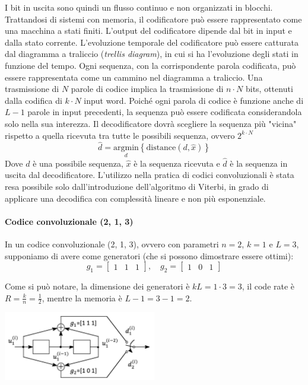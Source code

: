 I bit in uscita sono quindi un flusso continuo e non organizzati in blocchi.
Trattandosi di sistemi con memoria, il codificatore può essere rappresentato come una macchina a stati finiti.
L'output del codificatore dipende dal bit in input e dalla stato corrente.
L'evoluzione temporale del codificatore può essere catturata dal diagramma a traliccio (\textit{trellis diagram}), in cui si ha l'evoluzione degli stati in funzione del tempo.
Ogni sequenza, con la corrispondente parola codificata, può essere rappresentata come un cammino nel diagramma a traliccio.
Una trasmissione di $N$ parole di codice implica la trasmissione di $n \cdot N$ bits, ottenuti dalla codifica di $k \cdot N$ input word.
Poiché ogni parola  di codice è funzione anche di $L-1$ parole in input precedenti, la sequenza può essere codificata considerandola solo nella sua interezza. 
Il decodificatore dovrà scegliere la sequenza più "vicina" rispetto a quella ricevuta tra tutte le possibili sequenza, ovvero $2^{k \cdot N}$
\[
    \hat{d} = \underset{d}{\text{argmin}} \left\{\text{distance}(d, \hat{x})\right\}
\]
Dove $d$ è una possibile sequenza, $\hat{x}$ è la sequenza ricevuta e $\hat{d}$ è la sequenza in uscita dal decodificatore.
L'utilizzo nella pratica di codici convoluzionali è stata resa possibile solo dall'introduzione dell'algoritmo di Viterbi, in grado di applicare una decodifica con complessità lineare e non più esponenziale.

\paragraph*{Codice convoluzionale (2, 1, 3)}

In un codice convoluzionale (2, 1, 3), ovvero con parametri $n=2$, $k=1$ e $L=3$, supponiamo di avere come generatori (che si possono dimostrare essere ottimi):
\[
    g_1 = \begin{bmatrix}1 & 1 & 1\end{bmatrix}, \quad g_2 = \begin{bmatrix}1 & 0 & 1\end{bmatrix}
\]

Come si può notare, la dimensione dei generatori è $kL = 1 \cdot 3 = 3$, il code rate è $R = \frac{k}{n} = \frac{1}{2}$, mentre la memoria è $L - 1 = 3 - 1 = 2$.
\begin{center}
    \includegraphics[width=0.5\textwidth]{imgs/213code.png}
\end{center}

